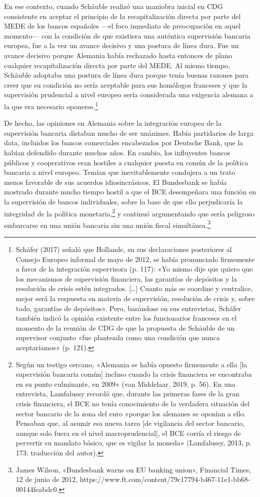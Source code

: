 \documentclass[10pt,a4paper]{article}
\begin{document}
{En ese contexto, cuando Schäuble realizó una maniobra inicial en CDG consistente en aceptar el principio de la recapitalización directa por parte del MEDE de los bancos españoles —el foco inmediato de preocupación en aquel momento— con la condición de que existiera una auténtica supervisión bancaria europea, fue a la vez un avance decisivo y una postura de línea dura. Fue un avance decisivo porque Alemania había rechazado hasta entonces de plano cualquier recapitalización directa por parte del MEDE. Al mismo tiempo, Schäuble adoptaba una postura de línea dura porque tenía buenas razones para creer que su condición no sería aceptable para sus homólogos franceses y que la supervisión prudencial a nivel europeo sería considerada una exigencia alemana a la que era necesario oponerse.\footnote{
Schäfer (2017) señaló que Hollande, en sus declaraciones posteriores al Consejo Europeo informal de mayo de 2012, se había pronunciado firmemente a favor de la integración supervisora (p. 117): «Yo mismo dije que quiero que los mecanismos de supervisión financiera, las garantías de depósitos y la resolución de crisis estén integrados. […] Cuanto más se coordine y centralice, mejor será la respuesta en materia de supervisión, resolución de crisis y, sobre todo, garantías de depósitos». Pero, basándose en sus entrevistas, Schäfer también indicó la opinión existente entre los funcionarios franceses en el momento de la reunión de CDG de que la propuesta de Schäuble de un supervisor conjunto «fue planteada como una condición que nunca aceptaríamos» (p. 121).
}

De hecho, las opiniones en Alemania sobre la integración europea de la supervisión bancaria distaban mucho de ser unánimes. Había partidarios de larga data, incluidos los bancos comerciales encabezados por Deutsche Bank, que la habían defendido durante muchos años. En cambio, los influyentes bancos públicos y cooperativos eran hostiles a cualquier puesta en común de la política bancaria a nivel europeo. Temían que inevitablemente condujera a un trato menos favorable de sus acuerdos idiosincrásicos. El Bundesbank se había mostrado durante mucho tiempo hostil a que el BCE desempeñara una función en la supervisión de bancos individuales, sobre la base de que ello perjudicaría la integridad de la política monetaria,\footnote{
Según un testigo cercano, «Alemania se había opuesto firmemente a ella [la supervisión bancaria común] incluso cuando la crisis financiera se encontraba en su punto culminante, en 2009» (van Middelaar, 2019, p. 56). En una entrevista, Lamfalussy recordó que, durante las primeras fases de la gran crisis financiera, el BCE no tenía conocimiento de la verdadera situación del sector bancario de la zona del euro «porque los alemanes se oponían a ello. Pensaban que, al asumir esa nueva tarea [de vigilancia del sector bancario, aunque solo fuera en el nivel macroprudencial], el BCE corría el riesgo de pervertir su mandato básico, que es vigilar la moneda» (Lamfalussy, 2013, p. 173; traducción del autor).
} y continuó argumentando que sería peligroso embarcarse en una unión bancaria sin una unión fiscal simultánea.\footnote{
James Wilson, «Bundesbank warns on EU banking union», Financial Times, 12 de junio de 2012, https://www.ft.com/content/79c17794-b467-11e1-bb68-00144feabdc0.
}

}
\end{document}
